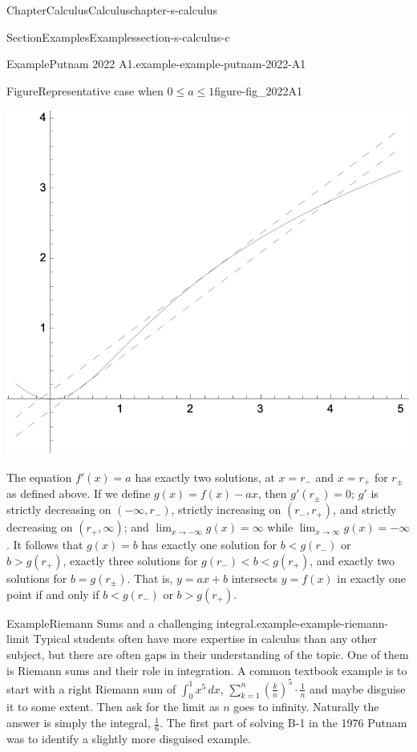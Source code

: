 \documentclass[oneside,10pt,]{book}
\numberwithin{equation}{section}
\newcommand{\lt}{<}
\newcommand{\gt}{>}
\begin{document}
\begin{chapterptx}{Chapter}{Calculus}{}{Calculus}{}{}{chapter-s-calculus}
\begin{sectionptx}{Section}{Examples}{}{Examples}{}{}{section-s-calculus-c}
\begin{example}{Example}{Putnam 2022 A1.}{example-example-putnam-2022-A1}
\begin{figureptx}{Figure}{Representative case when \(0 \leq a \leq 1\)}{figure-fig_2022A1}{}%
\begin{image}{0.2}{0.6}{0.2}%
\includegraphics[width=\linewidth]{images/fig_2022A1.png}
\end{image}%
\tcblower
\end{figureptx}%
The equation \(f'(x) = a\) has exactly two solutions, at \(x=r_-\) and \(x=r_+\) for \(r_{\pm}\) as defined above. If we define \(g(x) = f(x)-ax\), then \(g'(r_\pm)=0\); \(g'\) is strictly decreasing on \((-\infty,r_-)\), strictly increasing on \((r_-,r_+)\), and strictly decreasing on \((r_+,\infty)\); and \(\lim_{x\to-\infty} g(x) = \infty\) while \(\lim_{x\to\infty} g(x) = -\infty\). It follows that \(g(x)=b\) has exactly one solution for \(b \lt g(r_-)\) or \(b>g(r_+)\), exactly three solutions for \(g(r_-)\lt b \lt g(r_+)\), and exactly two solutions for \(b = g(r_\pm)\). That is, \(y=ax+b\) intersects \(y=f(x)\) in exactly one point if and only if \(b\lt g(r_-)\) or \(b\gt g(r_+)\).%
\end{example}
\begin{example}{Example}{Riemann Sums and a challenging integral.}{example-example-riemann-limit}%
%
Typical students often have more expertise in calculus than any other subject, but there are often gaps in their understanding of the topic.  One of them is Riemann sums and their role in integration.  A common textbook example is to start with a right Riemann sum of \(\int_0^1 x^5 \, dx\), \(\sum _{k=1}^n \left(\frac{k}{n}\right)^5 \cdot \frac{1}{n}\) and maybe disguise it to some extent.  Then ask for the limit as \(n\) goes to infinity.  Naturally the answer is simply the integral, \(\frac{1}{6}\).   The first part of solving B-1 in the 1976 Putnam was to identify a slightly more disguised example.%

\end{example}
\end{sectionptx}
\end{chapterptx}
\end{document}
